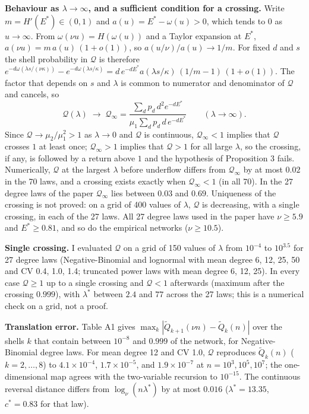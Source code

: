 \documentclass{nws}
\begin{document}
\textbf{Behaviour as $\lambda\to\infty$, and a sufficient condition for a crossing.} Write $m=H'(E^*)\in(0,1)$ and $a(u)=E^*-\omega(u)>0$, which tends to $0$ as $u\to\infty$. From $\omega(\nu u)=H(\omega(u))$ and a Taylor expansion at $E^*$, $a(\nu u)=m\,a(u)\,(1+o(1))$, so $a(u/\nu)/a(u)\to1/m$. For fixed $d$ and $s$ the shell probability in $\mathcal Q$ is therefore $e^{-d\omega(\lambda s/(\nu\kappa))}-e^{-d\omega(\lambda s/\kappa)}=d\,e^{-dE^*}a(\lambda s/\kappa)\,(1/m-1)\,(1+o(1))$. The factor that depends on $s$ and $\lambda$ is common to numerator and denominator of $\mathcal Q$ and cancels, so
\[
\mathcal Q(\lambda)\;\longrightarrow\;\mathcal Q_\infty=\frac{\sum_dp_d\,d^2e^{-dE^*}}{\mu_1\sum_dp_d\,d\,e^{-dE^*}}\qquad(\lambda\to\infty).
\]
Since $\mathcal Q\to\mu_2/\mu_1^2>1$ as $\lambda\to0$ and $\mathcal Q$ is continuous, $\mathcal Q_\infty<1$ implies that $\mathcal Q$ crosses $1$ at least once; $\mathcal Q_\infty>1$ implies that $\mathcal Q>1$ for all large $\lambda$, so the crossing, if any, is followed by a return above $1$ and the hypothesis of Proposition 3 fails. Numerically, $\mathcal Q$ at the largest $\lambda$ before underflow differs from $\mathcal Q_\infty$ by at most $0.02$ in the 70 laws, and a crossing exists exactly when $\mathcal Q_\infty<1$ (in all 70). In the 27 degree laws of the paper $\mathcal Q_\infty$ lies between $0.03$ and $0.69$. Uniqueness of the crossing is not proved: on a grid of 400 values of $\lambda$, $\mathcal Q$ is decreasing, with a single crossing, in each of the 27 laws. All 27 degree laws used in the paper have $\nu\ge5.9$ and $E^*\ge0.81$, and so do the empirical networks ($\nu\ge10.5$).

\textbf{Single crossing.} I evaluated $\mathcal Q$ on a grid of 150 values of $\lambda$ from $10^{-4}$ to $10^{3.5}$ for 27 degree laws (Negative-Binomial and lognormal with mean degree 6, 12, 25, 50 and CV 0.4, 1.0, 1.4; truncated power laws with mean degree 6, 12, 25). In every case $\mathcal Q\ge1$ up to a single crossing and $\mathcal Q<1$ afterwards (maximum after the crossing $0.999$), with $\lambda^*$ between $2.4$ and $77$ across the 27 laws; this is a numerical check on a grid, not a proof.

\textbf{Translation error.} Table A1 gives $\max_k|\tilde Q_{k+1}(\nu n)-\tilde Q_k(n)|$
over the shells $k$ that contain between $10^{-8}$ and $0.999$ of the network, for
Negative-Binomial degree laws. For mean degree 12 and CV 1.0, $\mathcal Q$ reproduces
$\tilde Q_k(n)$ ($k=2,\ldots,8$) to $4.1\times10^{-4}$, $1.7\times10^{-5}$, and
$1.9\times10^{-7}$ at $n=10^3,10^5,10^7$; the one-dimensional map agrees with the
two-variable recursion to $10^{-15}$. The continuous reversal distance differs from $\log_\nu(n\lambda^*)$ by at most $0.016$ ($\lambda^*=13.35$, $c^*=0.83$ for that law).
\end{document}
